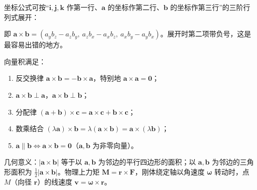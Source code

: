 坐标公式可按“$\boldsymbol{i},\boldsymbol{j},\boldsymbol{k}$ 作第一行、$\boldsymbol{a}$ 的坐标作第二行、$\boldsymbol{b}$ 的坐标作第三行”的三阶行列式展开：


即 $\boldsymbol{a}\times\boldsymbol{b}=(a_yb_z-a_zb_y,\ a_zb_x-a_xb_z,\ a_xb_y-a_yb_x)$。展开时第二项带负号，这是最容易出错的地方。

\begin{property}
向量积满足：
\begin{enumerate}
\item 反交换律 $\boldsymbol{a}\times\boldsymbol{b}=-\boldsymbol{b}\times\boldsymbol{a}$，特别地 $\boldsymbol{a}\times\boldsymbol{a}=\boldsymbol{0}$；
\item $\boldsymbol{a}\times\boldsymbol{b}\perp\boldsymbol{a}$，$\boldsymbol{a}\times\boldsymbol{b}\perp\boldsymbol{b}$；
\item 分配律 $(\boldsymbol{a}+\boldsymbol{b})\times\boldsymbol{c}=\boldsymbol{a}\times\boldsymbol{c}+\boldsymbol{b}\times\boldsymbol{c}$；
\item 数乘结合 $(\lambda\boldsymbol{a})\times\boldsymbol{b}=\lambda(\boldsymbol{a}\times\boldsymbol{b})=\boldsymbol{a}\times(\lambda\boldsymbol{b})$；
\item $\boldsymbol{a}\parallel\boldsymbol{b}\iff\boldsymbol{a}\times\boldsymbol{b}=\boldsymbol{0}$（$\boldsymbol{a},\boldsymbol{b}$ 为非零向量）。
\end{enumerate}
\end{property}

几何意义：$|\boldsymbol{a}\times\boldsymbol{b}|$ 等于以 $\boldsymbol{a},\boldsymbol{b}$ 为邻边的平行四边形的面积；以 $\boldsymbol{a},\boldsymbol{b}$ 为邻边的三角形面积为 $\frac12|\boldsymbol{a}\times\boldsymbol{b}|$。物理上力矩 $\boldsymbol{M}=\boldsymbol{r}\times\boldsymbol{F}$，刚体绕定轴以角速度 $\boldsymbol{\omega}$ 转动时，点 $M$（向径 $\boldsymbol{r}$）的线速度 $\boldsymbol{v}=\boldsymbol{\omega}\times\boldsymbol{r}$。

